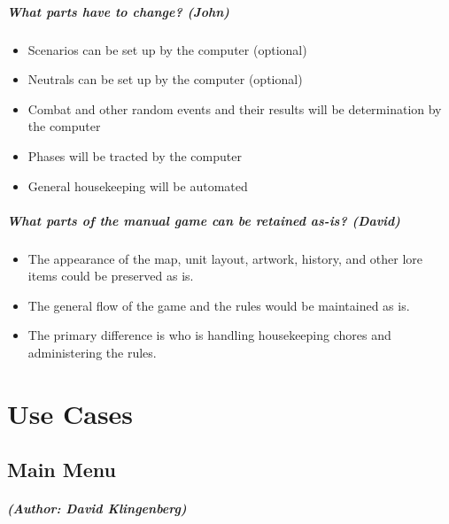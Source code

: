 \documentclass[12pt,letterpaper]{scrreprt}
\begin{document}
\paragraph{What parts have to change? (John)}
	\begin{itemize}
		\item Scenarios can be set up by the computer (optional)
		\item Neutrals can be set up by the computer (optional)
		\item Combat and other random events and their results will be determination by the computer
		\item Phases will be tracted by the computer
		\item General housekeeping will be automated
	\end{itemize}
	
\paragraph{What parts of the manual game can be retained as-is? (David)}
	\begin{itemize}
		\item The appearance of the map, unit layout, artwork, history, and other lore items could be preserved as is.
		\item The general flow of the game and the rules would be maintained as is.
		\item The primary difference is who is handling housekeeping chores and administering the rules.  
	\end{itemize}

\chapter{Use Cases}
%
%
\section{Main Menu}
\paragraph{(Author: David Klingenberg)}
\end{document}
